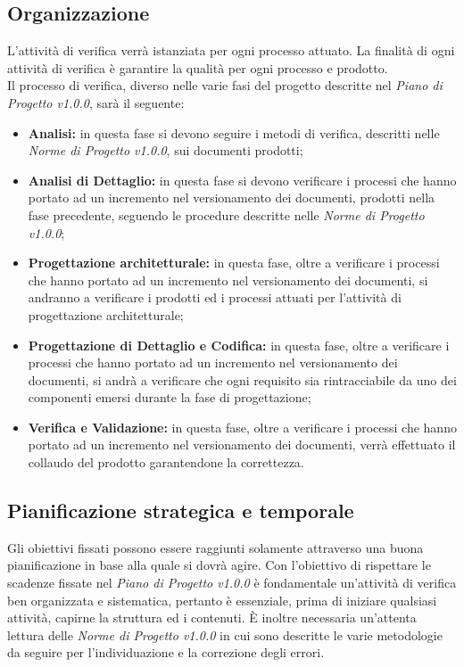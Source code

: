 \subsection{Organizzazione}
L'attività di verifica verrà istanziata per ogni processo attuato. La finalità di ogni attività di verifica è garantire la qualità per ogni processo e prodotto.\\
Il processo di verifica, diverso nelle varie fasi del progetto descritte nel \textit{Piano di Progetto v1.0.0}, sarà il seguente:
\begin{itemize}
	\item \textbf{Analisi:} in questa fase si devono seguire i metodi di verifica, descritti nelle \textit{Norme di Progetto v1.0.0}, sui documenti prodotti;
	\item \textbf{Analisi di Dettaglio:} in questa fase si devono verificare i processi che hanno portato ad un incremento nel \gls{versionamento} dei documenti, prodotti nella fase precedente, seguendo le procedure descritte nelle \textit{Norme di Progetto v1.0.0};
	\item \textbf{Progettazione architetturale:} in questa fase, oltre a verificare i processi che hanno portato ad un incremento nel \gls{versionamento} dei documenti, si andranno a verificare i prodotti ed i processi attuati per l'attività di progettazione architetturale;
	\item \textbf{Progettazione di Dettaglio e Codifica:} in questa fase, oltre a verificare i processi che hanno portato ad un incremento nel \gls{versionamento} dei documenti, si andrà a verificare che ogni requisito sia rintracciabile da uno dei componenti emersi durante la fase di progettazione;
	\item \textbf{Verifica e Validazione:} in questa fase, oltre a verificare i processi che hanno portato ad un incremento nel \gls{versionamento} dei documenti, verrà effettuato il collaudo del prodotto garantendone la correttezza.
\end{itemize} 

\subsection{Pianificazione strategica e temporale}
Gli obiettivi fissati possono essere raggiunti solamente attraverso una buona pianificazione in base alla quale si dovrà agire. Con l'obiettivo di rispettare le scadenze fissate nel \textit{Piano di Progetto v1.0.0} è fondamentale un'attività di verifica ben organizzata e sistematica, pertanto è essenziale, prima di iniziare qualsiasi attività, capirne la struttura ed i contenuti. È inoltre necessaria un'attenta lettura delle \textit{Norme di Progetto v1.0.0} in cui sono descritte le varie metodologie da seguire per l'individuazione e la correzione degli errori.

